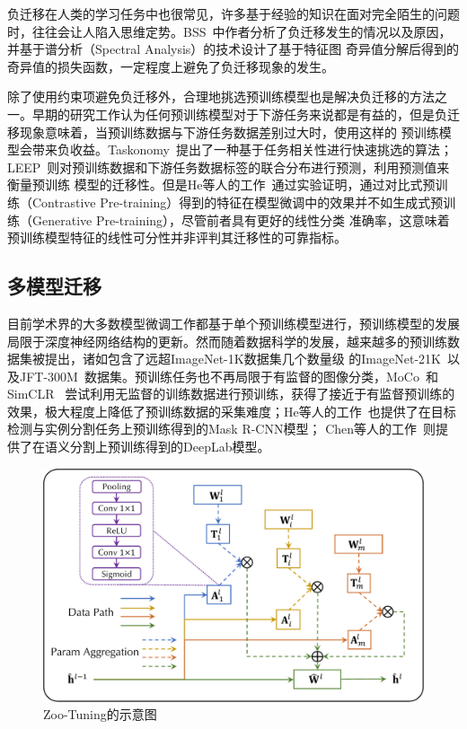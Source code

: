 负迁移在人类的学习任务中也很常见，许多基于经验的知识在面对完全陌生的问题时，往往会让人陷入思维定势。BSS~\citep{chen2019catastrophic}中作者分析了负迁移发生的情况以及原因，并基于谱分析（Spectral Analysis）的技术设计了基于特征图
奇异值分解后得到的奇异值的损失函数，一定程度上避免了负迁移现象的发生。

除了使用约束项避免负迁移外，合理地挑选预训练模型也是解决负迁移的方法之一。早期的研究工作认为任何预训练模型对于下游任务来说都是有益的，但是负迁移现象意味着，当预训练数据与下游任务数据差别过大时，使用这样的
预训练模型会带来负收益。Taskonomy~\citep{zamir_taskonomy:_2018}提出了一种基于任务相关性进行快速挑选的算法；LEEP~\citep{nguyen2020leep}则对预训练数据和下游任务数据标签的联合分布进行预测，利用预测值来衡量预训练
模型的迁移性。但是He等人的工作~\citep{he2021masked}通过实验证明，通过对比式预训练（Contrastive Pre-training）得到的特征在模型微调中的效果并不如生成式预训练（Generative Pre-training），尽管前者具有更好的线性分类
准确率，这意味着预训练模型特征的线性可分性并非评判其迁移性的可靠指标。

\subsection{多模型迁移}

目前学术界的大多数模型微调工作都基于单个预训练模型进行，预训练模型的发展局限于深度神经网络结构的更新。然而随着数据科学的发展，越来越多的预训练数据集被提出，诸如包含了远超ImageNet-1K数据集几个数量级
的ImageNet-21K~\citep{deng2009imagenet}以及JFT-300M~\citep{sun2017revisiting}数据集。预训练任务也不再局限于有监督的图像分类，MoCo~\citep{he2020momentum}和SimCLR~\citep{chen_simple_2020}
尝试利用无监督的训练数据进行预训练，获得了接近于有监督预训练的效果，极大程度上降低了预训练数据的采集难度；He等人的工作~\citep{he2017mask}也提供了在目标检测与实例分割任务上预训练得到的Mask R-CNN模型；
Chen等人的工作~\citep{chen2018encoder}则提供了在语义分割上预训练得到的DeepLab模型。

\begin{figure}
    \centering
    \includegraphics[width=0.8\linewidth]{figures/zootuning.pdf}
    \caption{Zoo-Tuning的示意图~\citep{shu2021zoo}}
    \label{fig:zoo}
\end{figure}

